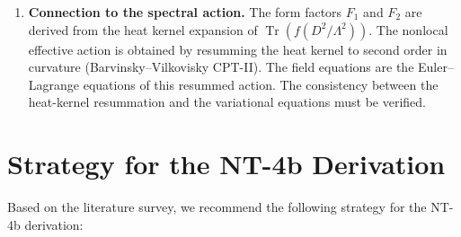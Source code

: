 \documentclass[12pt,a4paper]{article}
\theoremstyle{definition}
\theoremstyle{remark}
\newcommand{\Tr}{\operatorname{Tr}}
\begin{document}
\begin{enumerate}[label=\textbf{G\arabic*.}]
\item \textbf{Connection to the spectral action.}
  The form factors $F_1$ and $F_2$ are derived from the heat kernel
  expansion of $\Tr(f(D^2/\Lambda^2))$.  The nonlocal effective action
  is obtained by resumming the heat kernel to second order in curvature
  (Barvinsky--Vilkovisky CPT-II).  The field equations are the
  Euler--Lagrange equations of this resummed action.  The consistency
  between the heat-kernel resummation and the variational equations
  must be verified.
\end{enumerate}


\section{Strategy for the NT-4b Derivation}
\label{sec:strategy}

Based on the literature survey, we recommend the following strategy
for the NT-4b derivation:
\end{document}
